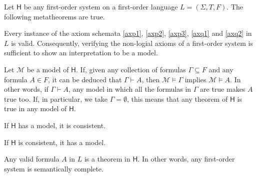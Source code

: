 \begin{theorem}
\label{proph}
Let $\mathsf{H}$ be any first-order system on a first-order language $L = (\Sigma,T,F)$. The following metatheorems are true.
\begin{statements}
\item \label{haxtrue} Every instance of the axiom schemata \ref{axp1}, \ref{axp2}, \ref{axp3}, \ref{axq1} and \ref{axq2} in $L$ is valid. Consequently, verifying the non-logial axioms of a first-order system is sufficient to show an interpretation to be a model.
\item \label{hsound} Let $\mathcal{M}$ be a model of $\mathsf{H}$. If, given any collection of formulas $\Gamma\subseteq F$ and any formula $A\in F$, it can be deduced that $\Gamma\vdash A$, then $\mathcal{M}\vDash \Gamma$ implies $\mathcal{M}\vDash A$. In other words, if $\Gamma\vdash A$, any model in which all the formulas in $\Gamma$ are true makes $A$ true too. If, in particular, we take $\Gamma = \emptyset$, this means that any theorem of $\mathsf{H}$ is true in any model of $\mathsf{H}$.
\item \label{hcons} If $\mathsf{H}$ has a model, it is consistent.
\item \label{consmodel} If $\mathsf{H}$ is consistent, it has a model.
\item \label{hsemc} Any valid formula $A$ in $L$ is a theorem in $\mathsf{H}$. In other words, any first-order system is semantically complete.
\end{statements}
\label{<+label+>}
\end{theorem}

